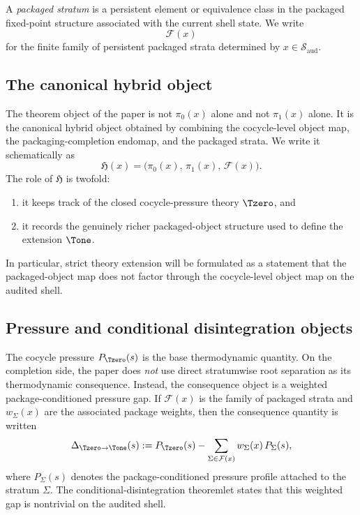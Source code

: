 A \emph{packaged stratum} is a persistent element or equivalence class in the packaged fixed-point structure associated with the current shell state. We write
\[
\mathcal{F}(x)
\]
for the finite family of persistent packaged strata determined by \(x\in \mathcal{S}_{\mathrm{aud}}\).

\subsection{The canonical hybrid object}

The theorem object of the paper is not \(\pi_0(x)\) alone and not \(\pi_1(x)\) alone. It is the canonical hybrid object obtained by combining the cocycle-level object map, the packaging-completion endomap, and the packaged strata. We write it schematically as
\[
\mathfrak{H}(x)=\bigl(\pi_0(x),\,\pi_1(x),\,\mathcal{F}(x)\bigr).
\]
The role of \(\mathfrak{H}\) is twofold:
\begin{enumerate}
    \item it keeps track of the closed cocycle-pressure theory \(\Tzero\), and
    \item it records the genuinely richer packaged-object structure used to define the extension \(\Tone\).
\end{enumerate}
In particular, strict theory extension will be formulated as a statement that the packaged-object map does not factor through the cocycle-level object map on the audited shell.

\subsection{Pressure and conditional disintegration objects}

The cocycle pressure \(P_{\Tzero}(s)\) is the base thermodynamic quantity. On the completion side, the paper does \emph{not} use direct stratumwise root separation as its thermodynamic consequence. Instead, the consequence object is a weighted package-conditioned pressure gap. If \(\mathcal{F}(x)\) is the family of packaged strata and \(w_{\Sigma}(x)\) are the associated package weights, then the consequence quantity is written
\[
\Delta_{\Tzero\to \Tone}(s)
:=
P_{\Tzero}(s)-\sum_{\Sigma\in\mathcal{F}(x)} w_{\Sigma}(x)\,P_{\Sigma}(s),
\]
where \(P_{\Sigma}(s)\) denotes the package-conditioned pressure profile attached to the stratum \(\Sigma\). The conditional-disintegration theoremlet states that this weighted gap is nontrivial on the audited shell.

